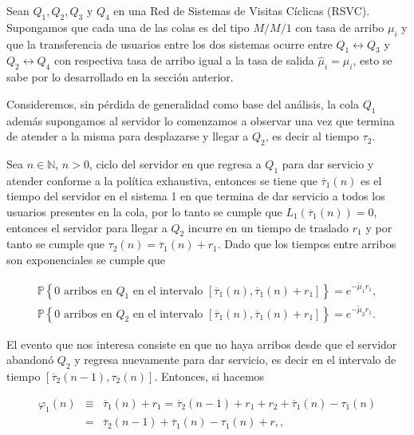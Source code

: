 \documentclass{article}
\newcommand{\nat}{\mathbb{N}}
\newcommand{\prob}{\mathbb{P}}
\begin{document}
Sean $Q_{1},Q_{2},Q_{3}$ y $Q_{4}$ en una Red de Sistemas de Visitas C\'iclicas (RSVC). Supongamos que cada una de las colas es del tipo $M/M/1$ con tasa de arribo $\mu_{i}$ y que la transferencia de usuarios entre los dos sistemas ocurre entre $Q_{1}\leftrightarrow Q_{3}$ y $Q_{2}\leftrightarrow Q_{4}$ con respectiva tasa de arribo igual a la tasa de salida $\hat{\mu}_{i}=\mu_{i}$, esto se sabe por lo desarrollado en la secci\'on anterior.  

Consideremos, sin p\'erdida de generalidad como base del an\'alisis, la cola $Q_{1}$ adem\'as supongamos al servidor lo comenzamos a observar una vez que termina de atender a la misma para desplazarse y llegar a $Q_{2}$, es decir al tiempo $\tau_{2}$.

Sea $n\in\nat$, $n>0$, ciclo del servidor en que regresa a $Q_{1}$ para dar servicio y atender conforme a la pol\'itica exhaustiva, entonces se tiene que $\overline{\tau}_{1}\left(n\right)$ es el tiempo del servidor en el sistema 1 en que termina de dar servicio a todos los usuarios presentes en la cola, por lo tanto se cumple que $L_{1}\left(\overline{\tau}_{1}\left(n\right)\right)=0$, entonces el servidor para llegar a $Q_{2}$ incurre en un tiempo de traslado $r_{1}$ y por tanto se cumple que $\tau_{2}\left(n\right)=\overline{\tau}_{1}\left(n\right)+r_{1}$. Dado que los tiempos entre arribos son exponenciales se cumple que 

\begin{eqnarray*}
\prob\left\{0 \textrm{ arribos en }Q_{1}\textrm{ en el intervalo }\left[\overline{\tau}_{1}\left(n\right),\overline{\tau}_{1}\left(n\right)+r_{1}\right]\right\}=e^{-\tilde{\mu}_{1}r_{1}},\\
\prob\left\{0 \textrm{ arribos en }Q_{2}\textrm{ en el intervalo }\left[\overline{\tau}_{1}\left(n\right),\overline{\tau}_{1}\left(n\right)+r_{1}\right]\right\}=e^{-\tilde{\mu}_{2}r_{1}}.
\end{eqnarray*}

El evento que nos interesa consiste en que no haya arribos desde que el servidor abandon\'o $Q_{2}$ y regresa nuevamente para dar servicio, es decir en el intervalo de tiempo $\left[\overline{\tau}_{2}\left(n-1\right),\tau_{2}\left(n\right)\right]$. Entonces, si hacemos


\begin{eqnarray*}
\varphi_{1}\left(n\right)&\equiv&\overline{\tau}_{1}\left(n\right)+r_{1}=\overline{\tau}_{2}\left(n-1\right)+r_{1}+r_{2}+\overline{\tau}_{1}\left(n\right)-\tau_{1}\left(n\right)\\
&=&\overline{\tau}_{2}\left(n-1\right)+\overline{\tau}_{1}\left(n\right)-\tau_{1}\left(n\right)+r,,
\end{eqnarray*}
\end{document}
